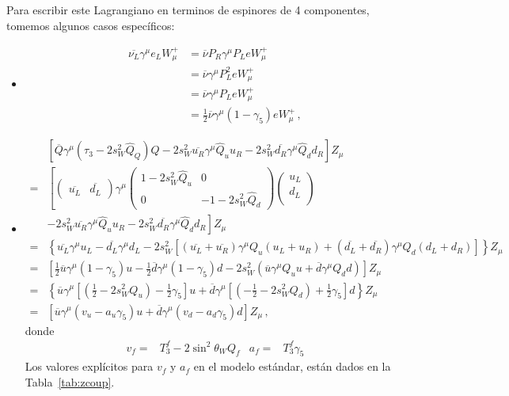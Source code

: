 \begin{frame}
Para escribir este Lagrangiano en terminos de espinores de 4 componentes, tomemos algunos casos específicos:
\begin{itemize}
\item 
\begin{align}
\label{eq:wf4}
  \overline{\nu_L}\gamma^\mu e_LW_\mu^+&=\overline{\nu}P_R\gamma^\mu P_LeW_\mu^+\nonumber\\
&=\overline{\nu}\gamma^\mu P_L^2eW_\mu^+\nonumber\\
&=\overline{\nu}\gamma^\mu P_LeW_\mu^+\nonumber\\
&=\frac{1}{2}\overline{\nu}\gamma^\mu(1-\gamma_5)eW_\mu^+\,,
\end{align}

\item
  \begin{align}
\label{eq:zf4}
    &\left[\overline{Q}\gamma^\mu\left( \tau_3-2s_W^2\widehat{Q}_Q\right)Q
      -2s_W^2\overline{u_R}\gamma^\mu\widehat{Q}_u u_R-2s_W^2\overline{d_R}\gamma^\mu\widehat{Q}_d d_R\right]Z_\mu\nonumber\\
=&\left[\begin{pmatrix}
      \overline{u_L} &\overline{d_L}
    \end{pmatrix}\gamma^\mu
    \begin{pmatrix}
      1-2s_W^2\widehat{Q}_u & 0\\
      0 &-1-2s_W^2\widehat{Q}_d
    \end{pmatrix}
    \begin{pmatrix}
      u_L\\
      d_L\\
    \end{pmatrix}\right.\nonumber\\
    &\left.-2s_W^2\overline{u_R}\gamma^\mu\widehat{Q}_u u_R-2s_W^2\overline{d_R}\gamma^\mu\widehat{Q}_d d_R
  \right]Z_\mu\nonumber\\
    =&\left\{\overline{u_L}\gamma^\mu u_L-\overline{d_L}\gamma^\mu d_L
-2s_W^2\left[\left(\overline{u_L}+\overline{u_R}\right)\gamma^\mu Q_u\left(u_L+u_R\right)
+\left(\overline{d_L}+\overline{d_R}\right)\gamma^\mu Q_d\left(d_L+d_R\right)
\right]\right\}Z_\mu \nonumber\\
        =&\left[\frac{1}{2}\overline{u}\gamma^\mu(1-\gamma_5)u-\frac{1}{2}\overline{d}\gamma^\mu(1-\gamma_5)d
-2s_W^2\left(\overline{u}\gamma^\mu Q_u u
+\overline{d}\gamma^\mu Q_d d
\right)\right]Z_\mu\nonumber\\
        =&\left\{\overline{u}\gamma^\mu\left[\left(\frac{1}{2}-2s_W^2Q_u\right)-\frac{1}{2}\gamma_5\right]u+
\overline{d}\gamma^\mu\left[\left(-\frac{1}{2}-2s_W^2Q_d\right)+\frac{1}{2}\gamma_5\right]d
\right\}Z_\mu\nonumber\\
  =&\left[\overline{u}\gamma^\mu\left(v_u-a_u\gamma_5\right)u+\overline{d}\gamma^\mu\left(v_d-a_d\gamma_5\right)d\right]Z_\mu\,,
  \end{align}
donde
\begin{align}
  v_f=&T_3^f-2 \sin^2\theta_WQ_f & a_f=&T_3^f \gamma_5
\end{align}
Los valores explícitos para  $v_f$ y $a_f$ en el modelo estándar, están dados en la Tabla~\ref{tab:zcoup}. 
\end{itemize}



\end{frame}
